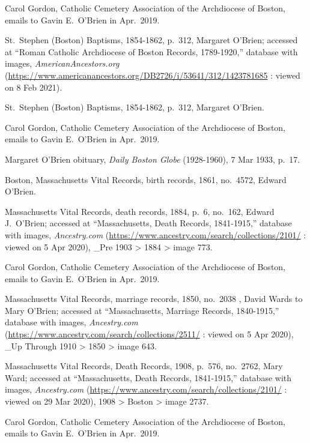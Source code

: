 \begin{thebibliography}{999}
Carol Gordon, Catholic Cemetery Association of the Archdiocese of Boston, emails to Gavin E.\ O'Brien in Apr.\ 2019.

St.\ Stephen (Boston) Baptisms, 1854-1862, p.\ 312, Margaret O'Brien; accessed at ``Roman Catholic Archdiocese of Boston Records, 1789-1920,'' database with images, \textit{AmericanAncestors.org} (\url{https://www.americanancestors.org/DB2726/i/53641/312/1423781685} : viewed on 8 Feb 2021).

St.\ Stephen (Boston) Baptisms, 1854-1862, p.\ 312, Margaret O'Brien.

Carol Gordon, Catholic Cemetery Association of the Archdiocese of Boston, emails to Gavin E.\ O'Brien in Apr.\ 2019.

Margaret O'Brien obituary, \textit{Daily Boston Globe} (1928-1960), 7 Mar 1933, p.\ 17.

Boston, Massachusetts Vital Records, birth records, 1861, no.\ 4572, Edward O'Brien.

Massachusetts Vital Records, death records, 1884, p.\ 6, no.\ 162, Edward J.\ O'Brien; accessed at ``Massachusetts, Death Records, 1841-1915,'' database with images, \textit{Ancestry.com} (\url{https://www.ancestry.com/search/collections/2101/} : viewed on 5 Apr 2020), \_Pre 1903 > 1884 > image 773.	

Carol Gordon, Catholic Cemetery Association of the Archdiocese of Boston, emails to Gavin E.\ O'Brien in Apr.\ 2019.


Massachusetts Vital Records, marriage records, 1850, no.\ 2038 , David Wards to Mary O'Brien; accessed at ``Massachusetts, Marriage Records, 1840-1915,'' database with images, \textit{Ancestry.com} (\url{https://www.ancestry.com/search/collections/2511/} : viewed on 5 Apr 2020), \_Up Through 1910 > 1850 > image 643.

Massachusetts Vital Records, Death Records, 1908, p.\ 576, no.\ 2762, Mary Ward; accessed at ``Massachusetts, Death Records, 1841-1915,'' database with images, \textit{Ancestry.com} (\url{https://www.ancestry.com/search/collections/2101/} : viewed on 29 Mar 2020), 1908 > Boston > image 2737.

Carol Gordon, Catholic Cemetery Association of the Archdiocese of Boston, emails to Gavin E.\ O'Brien in Apr.\ 2019.


\end{thebibliography}
